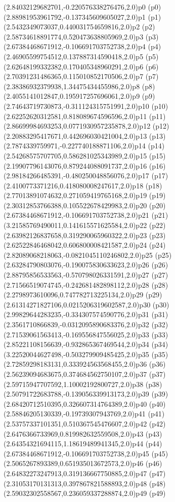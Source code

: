 \psPoint(2.84032129682701,-0.220576338276476,2.0){p0}
\psdot(p0)
\psPoint(2.88981953961792,-0.137345609605027,2.0){p1}
\psdot(p1)
\psPoint(2.5432349073037,0.440031754659816,2.0){p2}
\psdot(p2)
\psPoint(2.58734618891774,0.520473638805969,2.0){p3}
\psdot(p3)
\psPoint(2.67384468671912,-0.106691703752738,2.0){p4}
\psdot(p4)
\psPoint(2.46905599754512,0.137887314590418,2.0){p5}
\psdot(p5)
\psPoint(2.62648199332382,0.170405348960291,2.0){p6}
\psdot(p6)
\psPoint(2.70391231486365,0.115010852170506,2.0){p7}
\psdot(p7)
\psPoint(2.38386932379938,1.34475434455986,2.0){p8}
\psdot(p8)
\psPoint(2.4055141012847,0.195917257696061,2.0){p9}
\psdot(p9)
\psPoint(2.74643719730873,-0.311124315751991,2.0){p10}
\psdot(p10)
\psPoint(2.62252620312581,0.818089674596596,2.0){p11}
\psdot(p11)
\psPoint(2.86699984693253,0.0771930957235878,2.0){p12}
\psdot(p12)
\psPoint(2.20883295417671,0.442696030421004,2.0){p13}
\psdot(p13)
\psPoint(2.7874339759971,-0.227740188871106,2.0){p14}
\psdot(p14)
\psPoint(2.54268575707705,0.586281025343989,2.0){p15}
\psdot(p15)
\psPoint(2.19907796143076,0.879244088091737,2.0){p16}
\psdot(p16)
\psPoint(2.98184266485391,-0.480250048856076,2.0){p17}
\psdot(p17)
\psPoint(2.4100773371216,0.418080008247617,2.0){p18}
\psdot(p18)
\psPoint(2.77013891074632,0.271059419765168,2.0){p19}
\psdot(p19)
\psPoint(2.30312853766388,0.105522678429983,2.0){p20}
\psdot(p20)
\psPoint(2.67384468671912,-0.106691703752738,2.0){p21}
\psdot(p21)
\psPoint(3.21585769490011,0.141615571625584,2.0){p22}
\psdot(p22)
\psPoint(2.63982126837658,0.319290065960322,2.0){p23}
\psdot(p23)
\psPoint(2.62522846468042,0.606800008421587,2.0){p24}
\psdot(p24)
\psPoint(2.82089068218063,-0.0821045110246802,2.0){p25}
\psdot(p25)
\psPoint(2.63284790803076,-0.190075830633623,2.0){p26}
\psdot(p26)
\psPoint(2.88795856533563,-0.570798026331591,2.0){p27}
\psdot(p27)
\psPoint(2.71566519074745,-0.242681482898112,2.0){p28}
\psdot(p28)
\psPoint(2.2798973610096,0.747782713225134,2.0){p29}
\psdot(p29)
\psPoint(2.61314271827106,0.0215206319602587,2.0){p30}
\psdot(p30)
\psPoint(2.99829644283235,-0.334307574590776,2.0){p31}
\psdot(p31)
\psPoint(2.3561710866839,-0.0312095890683376,2.0){p32}
\psdot(p32)
\psPoint(2.71539061563413,-0.169556847556025,2.0){p33}
\psdot(p33)
\psPoint(2.85221108156639,-0.932865367469544,2.0){p34}
\psdot(p34)
\psPoint(3.22520044627498,-0.503279909485425,2.0){p35}
\psdot(p35)
\psPoint(2.72859298183131,0.333924563568455,2.0){p36}
\psdot(p36)
\psPoint(2.56239094683675,0.374684562750107,2.0){p37}
\psdot(p37)
\psPoint(2.59715947707592,1.10002192800727,2.0){p38}
\psdot(p38)
\psPoint(2.50791722683788,-0.139056339913173,2.0){p39}
\psdot(p39)
\psPoint(2.68420712510395,0.326607314764389,2.0){p40}
\psdot(p40)
\psPoint(2.58846205130339,-0.19739307943769,2.0){p41}
\psdot(p41)
\psPoint(2.53757337101351,0.510367545476607,2.0){p42}
\psdot(p42)
\psPoint(2.6476366733969,0.819982632559508,2.0){p43}
\psdot(p43)
\psPoint(2.64354321694115,1.18619489941345,2.0){p44}
\psdot(p44)
\psPoint(2.67384468671912,-0.106691703752738,2.0){p45}
\psdot(p45)
\psPoint(2.5065267893389,0.651935013672573,2.0){p46}
\psdot(p46)
\psPoint(2.64832273247913,0.319136667750885,2.0){p47}
\psdot(p47)
\psPoint(2.31053170131313,0.397867821588893,2.0){p48}
\psdot(p48)
\psPoint(2.59032302558567,0.236059337288874,2.0){p49}
\psdot(p49)
